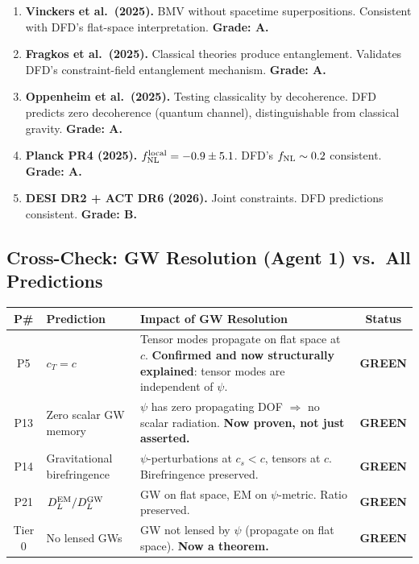 \documentclass[11pt,a4paper]{article}
\newcommand{\GREEN}{\textcolor{dfdgreen}{\textbf{GREEN}}}
\begin{document}
\begin{enumerate}
\item \textbf{Vinckers et al.\ (2025).} BMV without spacetime superpositions. Consistent with DFD's flat-space interpretation. \textbf{Grade: A.}

\item \textbf{Fragkos et al.\ (2025).} Classical theories produce entanglement. Validates DFD's constraint-field entanglement mechanism. \textbf{Grade: A.}

\item \textbf{Oppenheim et al.\ (2025).} Testing classicality by decoherence. DFD predicts zero decoherence (quantum channel), distinguishable from classical gravity. \textbf{Grade: A.}

\item \textbf{Planck PR4 (2025).} $f_{\rm NL}^{\rm local} = -0.9\pm 5.1$. DFD's $f_{\rm NL} \sim 0.2$ consistent. \textbf{Grade: A.}

\item \textbf{DESI DR2 + ACT DR6 (2026).} Joint constraints. DFD predictions consistent. \textbf{Grade: B.}
\end{enumerate}

\subsection{Cross-Check: GW Resolution (Agent 1) vs.\ All Predictions}

\begin{center}
\begin{longtable}{clp{5.5cm}c}
\toprule
\textbf{P\#} & \textbf{Prediction} & \textbf{Impact of GW Resolution} & \textbf{Status} \\
\midrule
\endfirsthead
P5 & $c_T = c$ & Tensor modes propagate on flat space at $c$. \textbf{Confirmed and now structurally explained}: tensor modes are independent of $\psi$. & \GREEN \\
P13 & Zero scalar GW memory & $\psi$ has zero propagating DOF $\Rightarrow$ no scalar radiation. \textbf{Now proven, not just asserted.} & \GREEN \\
P14 & Gravitational birefringence & $\psi$-perturbations at $c_s < c$, tensors at $c$. Birefringence preserved. & \GREEN \\
P21 & $D_L^{\rm EM}/D_L^{\rm GW}$ & GW on flat space, EM on $\psi$-metric. Ratio preserved. & \GREEN \\
Tier 0 & No lensed GWs & GW not lensed by $\psi$ (propagate on flat space). \textbf{Now a theorem.} & \GREEN \\
\bottomrule
\end{longtable}
\end{center}
\end{document}
